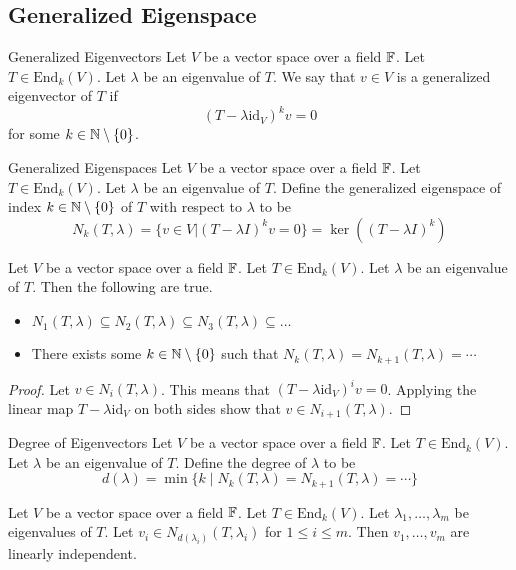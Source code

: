 \documentclass[a4paper]{article}
\begin{document}
\subsection{Generalized Eigenspace}
\begin{defn}{Generalized Eigenvectors}{} Let $V$ be a vector space over a field $\mathbb{F}$. Let $T\in\text{End}_k(V)$. Let $\lambda$ be an eigenvalue of $T$. We say that $v\in V$ is a generalized eigenvector of $T$ if $$(T-\lambda\text{id}_V)^kv=0$$ for some $k\in\mathbb{N}\setminus\{0\}$. 
\end{defn}

\begin{defn}{Generalized Eigenspaces}{} Let $V$ be a vector space over a field $\mathbb{F}$. Let $T\in\text{End}_k(V)$. Let $\lambda$ be an eigenvalue of $T$. Define the generalized eigenspace of index $k\in\mathbb{N}\setminus\{0\}$ of $T$ with respect to $\lambda$ to be $$N_k(T,\lambda)=\{v\in V|(T-\lambda I)^kv=0\}=\ker((T-\lambda I)^k)$$
\end{defn}

\begin{prp}{}{} Let $V$ be a vector space over a field $\mathbb{F}$. Let $T\in\text{End}_k(V)$. Let $\lambda$ be an eigenvalue of $T$. Then the following are true. 
\begin{itemize}
\item $N_1(T,\lambda)\subseteq N_2(T,\lambda)\subseteq N_3(T,\lambda)\subseteq\dots$
\item There exists some $k\in\mathbb{N}\setminus\{0\}$ such that $N_k(T,\lambda)=N_{k+1}(T,\lambda)=\cdots$
\end{itemize} 
\begin{proof}
Let $v\in N_i(T,\lambda)$. This means that $(T-\lambda\text{id}_V)^iv=0$. Applying the linear map $T-\lambda\text{id}_V$ on both sides show that $v\in N_{i+1}(T,\lambda)$. 
\end{proof}
\end{prp}

\begin{defn}{Degree of Eigenvectors}{} Let $V$ be a vector space over a field $\mathbb{F}$. Let $T\in\text{End}_k(V)$. Let $\lambda$ be an eigenvalue of $T$. Define the degree of $\lambda$ to be $$d(\lambda)=\min\{k\;|\;N_k(T,\lambda)=N_{k+1}(T,\lambda)=\cdots\}$$
\end{defn}

\begin{prp}{}{} Let $V$ be a vector space over a field $\mathbb{F}$. Let $T\in\text{End}_k(V)$. Let $\lambda_1,\dots,\lambda_m$ be eigenvalues of $T$. Let $v_i\in N_{d(\lambda_i)}(T,\lambda_i)$ for $1\leq i\leq m$. Then $v_1,\dots,v_m$ are linearly independent. 
\end{prp}
\end{document}
